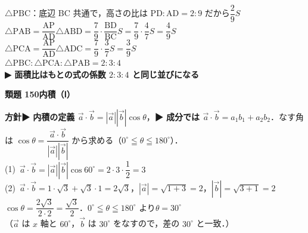 \documentclass[a4paper,11pt]{ltjsarticle}
\newcommand{\ans}[2]{\Needspace{5\baselineskip}\vspace{6pt}%
  {\sffamily\bfseries 類題 #1\quad #2}\par}
\newcommand{\point}[1]{\textsf{\bfseries ▶ #1}}
\newcommand{\ax}[4]{\draw[->] (#1,0)--(#2,0) node[right]{\scriptsize $x$};
  \draw[->] (0,#3)--(0,#4) node[above]{\scriptsize $y$};
  \node[below left] at (0,0){\scriptsize O};}
\begin{document}
\begin{kai}
\begin{center}
\begin{tikzpicture}[scale=0.8]
\end{tikzpicture}
\end{center}
\hspace*{1.5em}$\triangle\mathrm{PBC}$：底辺 BC 共通で，高さの比は $\mathrm{PD}:\mathrm{AD}=2:9$ だから\quad $\dfrac29S$\\
\hspace*{1.5em}$\triangle\mathrm{PAB}=\dfrac{\mathrm{AP}}{\mathrm{AD}}\triangle\mathrm{ABD}=\dfrac79\cdot\dfrac{\mathrm{BD}}{\mathrm{BC}}S=\dfrac79\cdot\dfrac47S=\dfrac49S$\\
\hspace*{1.5em}$\triangle\mathrm{PCA}=\dfrac{\mathrm{AP}}{\mathrm{AD}}\triangle\mathrm{ADC}=\dfrac79\cdot\dfrac37S=\dfrac39S$\\
\hspace*{1.5em}$\triangle\mathrm{PBC}:\triangle\mathrm{PCA}:\triangle\mathrm{PAB}=2:3:4$\\
\hspace*{1.5em}\point{面積比はもとの式の係数 $2:3:4$ と同じ並びになる}
\end{kai}

\ans{150}{内積（Ⅰ）}
\begin{kai}
\textbf{方針}\quad \point{内積の定義 $\vec a\cdot\vec b=|\vec a||\vec b|\cos\theta$}，\point{成分では $\vec a\cdot\vec b=a_1b_1+a_2b_2$}．なす角は $\cos\theta=\dfrac{\vec a\cdot\vec b}{|\vec a||\vec b|}$ から求める（$0^\circ\leqq\theta\leqq180^\circ$）．\\[2pt]
(1)\ $\vec a\cdot\vec b=|\vec a||\vec b|\cos60^\circ=2\cdot3\cdot\dfrac12=3$\\[2pt]
(2)\ $\vec a\cdot\vec b=1\cdot\sqrt3+\sqrt3\cdot1=2\sqrt3$，\quad $|\vec a|=\sqrt{1+3}=2$，\quad $|\vec b|=\sqrt{3+1}=2$\\
\hspace*{1.5em}$\cos\theta=\dfrac{2\sqrt3}{2\cdot2}=\dfrac{\sqrt3}2$．$0^\circ\leqq\theta\leqq180^\circ$ より\quad $\theta=30^\circ$\\
\hspace*{1.5em}（$\vec a$ は $x$ 軸と $60^\circ$，$\vec b$ は $30^\circ$ をなすので，差の $30^\circ$ と一致．）
\begin{center}
\end{center}
\end{kai}
\end{document}
